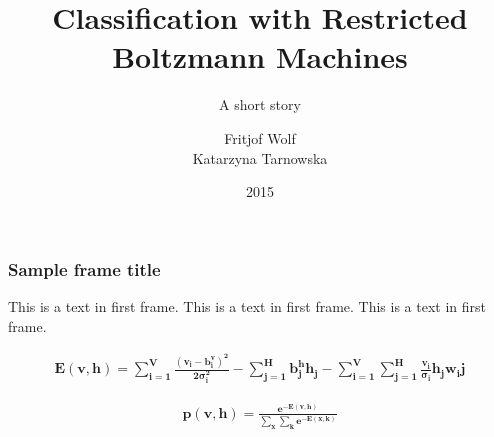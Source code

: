 \documentclass{beamer}
\title{Classification with Restricted Boltzmann Machines}
\subtitle{A short story}
\author{Fritjof Wolf \\ Katarzyna Tarnowska}
\institute{Projects in Machine Learning and AI}
\date{2015}
\begin{document}
\maketitle
 
 
\frame{\titlepage}
 
\begin{frame}
\frametitle{Sample frame title}
This is a text in first frame. This is a text in first frame. This is a text in first frame.
\end{frame}


\begin{align}
    \mathbf{E(v,h) = \sum_{i=1}^{V} \frac{(v_i - b_i^v)^2}{2\sigma_i^2} - \sum_{j=1}^{H} b_j^h h_j - \sum_{i=1}^{V} \sum_{j=1}^{H} \frac{v_i}{\sigma_i} h_j w_ij}
\end{align}

\begin{align}
    \mathbf{p(v,h) = \frac{e^{-E(v,h)}}{\sum_x \sum_k e^{-E(x,k)}}}
\end{align}
 
\end{document}
